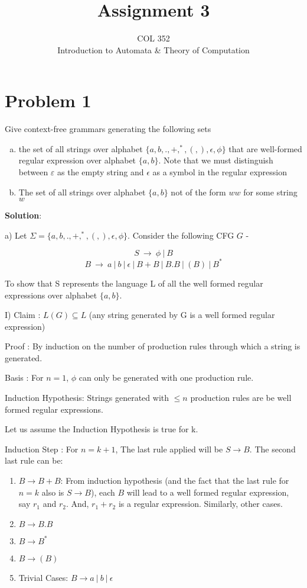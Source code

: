 \documentclass{article}
\title{Assignment 3}
\author{COL 352\\
    Introduction to Automata \& 
    Theory of Computation}
\date{}
\begin{document}
    \maketitle
    
    \section*{Problem 1} Give context-free grammars generating the following sets
    
    \begin{enumerate}[(a)]
        \item the set of all strings over alphabet $\{a,b,.,+,^*,(,),\epsilon,\phi\}$ that are well-formed regular expression over alphabet $\{a,b\}$.  Note that we must distinguish between $\varepsilon$ as the empty string and $\epsilon$ as a symbol in the regular expression
        \item The set of all strings over alphabet $\{a,b\}$ not of the form $ww$ for some string $w$
    \end{enumerate}
    
    \textbf{Solution}:
    
    a) Let $\Sigma = \{a,b,.,+,^*,(,),\epsilon,\phi\}$. Consider the following CFG $G$ -
    
    $$ S \ \rightarrow \ \phi \ |\ B$$
    $$ B \ \rightarrow \ a\ |\ b \ |\ \epsilon \ |\ B+B\ |\ B.B\ |\ (B)\ |\ B^* $$
    
    \quad To show that S represents the language L of all the well formed regular expressions over alphabet $\{a,b\}$.
    
    \quad I) Claim : $L(G) \subseteq L $ (any string generated by G is a well formed regular expression)
    
    \quad Proof : By induction on the number of production rules through which a string is generated.
    
    \quad Basis : For $n=1$, $\phi$ can only be generated with one production rule.
    
    \quad Induction Hypothesis: Strings generated with $\leq n$ production rules are be well formed regular expressions.
    
    \quad Let us assume the Induction Hypothesis is true for k.
    
    \quad Induction Step : For $n = k + 1$, The last rule applied will be $S\rightarrow B$. The second last rule can be:
    \begin{enumerate}
        \item $B \rightarrow B + B$: From induction hypothesis (and the fact that the last rule for $n = k$ also is $S \rightarrow B$), each $B$ will lead to a well formed regular expression, say $r_1$ and $r_2$. And, $r_1 + r_2$ is a regular expression. 
        Similarly, other cases.
        \item $B \rightarrow B.B$
        \item $B \rightarrow B^*$
        \item $B \rightarrow (B)$
        \item Trivial Cases: $B \rightarrow a\ |\ b\ |\ \epsilon$
    \end{enumerate}
    
\end{document}
